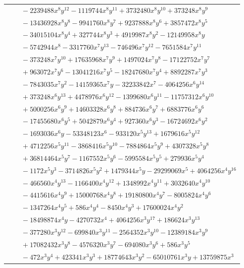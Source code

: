 \documentclass[11pt]{article}
\begin{document}
\begin{longtable}{@{}ll@{}}
 & $\quad -2239488x^{8}y^{12}-1119744x^{8}y^{11}+3732480x^{8}y^{10}+373248x^{8}y^{9}$\\
 & $\quad -13436928x^{8}y^{8}-9941760x^{8}y^{7}+9237888x^{8}y^{6}+3857472x^{8}y^{5}$\\
 & $\quad -34015104x^{8}y^{4}+327744x^{8}y^{3}+4919987x^{8}y^{2}-12149958x^{8}y$\\
 & $\quad -5742944x^{8}-3317760x^{7}y^{13}-746496x^{7}y^{12}-7651584x^{7}y^{11}$\\
 & $\quad -373248x^{7}y^{10}+17635968x^{7}y^{9}+1497024x^{7}y^{8}-17122752x^{7}y^{7}$\\
 & $\quad +963072x^{7}y^{6}-13041216x^{7}y^{5}-18247680x^{7}y^{4}+8892287x^{7}y^{3}$\\
 & $\quad -7843035x^{7}y^{2}-14159365x^{7}y-32233842x^{7}-4064256x^{6}y^{14}$\\
 & $\quad +373248x^{6}y^{13}+4478976x^{6}y^{12}-1399680x^{6}y^{11}-11757312x^{6}y^{10}$\\
 & $\quad +5000256x^{6}y^{9}+14603328x^{6}y^{8}+884736x^{6}y^{7}+6883776x^{6}y^{6}$\\
 & $\quad -17455680x^{6}y^{5}+5042879x^{6}y^{4}+927360x^{6}y^{3}-16724692x^{6}y^{2}$\\
 & $\quad -1693036x^{6}y-53348123x^{6}-933120x^{5}y^{13}+1679616x^{5}y^{12}$\\
 & $\quad +4712256x^{5}y^{11}-3868416x^{5}y^{10}-7884864x^{5}y^{9}+4307328x^{5}y^{8}$\\
 & $\quad +36814464x^{5}y^{7}-1167552x^{5}y^{6}-5995584x^{5}y^{5}+279936x^{5}y^{4}$\\
 & $\quad -1172x^{5}y^{3}-3714826x^{5}y^{2}+1479344x^{5}y-29299069x^{5}+4064256x^{4}y^{16}$\\
 & $\quad -466560x^{4}y^{13}-1166400x^{4}y^{12}+1348992x^{4}y^{11}+3032640x^{4}y^{10}$\\
 & $\quad -4415616x^{4}y^{9}+15000768x^{4}y^{8}+19180800x^{4}y^{7}-8005824x^{4}y^{6}$\\
 & $\quad -1347264x^{4}y^{5}+586x^{4}y^{4}-8450x^{4}y^{3}+17600024x^{4}y^{2}$\\
 & $\quad -18498874x^{4}y-4270732x^{4}+4064256x^{3}y^{17}+186624x^{3}y^{13}$\\
 & $\quad -377280x^{3}y^{12}-699840x^{3}y^{11}-2564352x^{3}y^{10}-12389184x^{3}y^{9}$\\
 & $\quad +17082432x^{3}y^{8}-4576320x^{3}y^{7}-694080x^{3}y^{6}+586x^{3}y^{5}$\\
 & $\quad -472x^{3}y^{4}+423341x^{3}y^{3}+18774643x^{3}y^{2}-65010761x^{3}y+13759875x^{3}$\\

\end{longtable}
\end{document}
